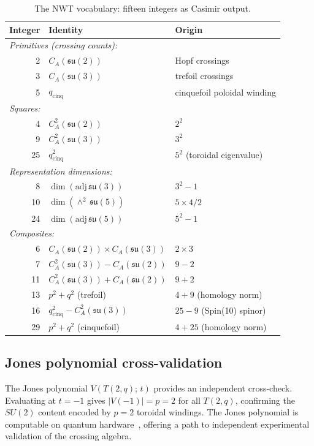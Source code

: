 \documentclass[11pt]{article}
\newcommand{\su}{\mathfrak{su}}
\newcommand{\CA}{C_A}
\begin{document}
\begin{table}[h]
\centering
\caption{The NWT vocabulary: fifteen integers as Casimir output.}
\label{tab:vocabulary}
\begin{tabular}{rll}
\toprule
Integer & Identity & Origin \\
\midrule
\multicolumn{3}{l}{\textit{Primitives (crossing counts):}}\\
2  & $\CA(\su(2))$ & Hopf crossings\\
3  & $\CA(\su(3))$ & trefoil crossings\\
5  & $q_\text{cinq}$ & cinquefoil poloidal winding\\
\midrule
\multicolumn{3}{l}{\textit{Squares:}}\\
4  & $\CA^2(\su(2))$   & $2^2$\\
9  & $\CA^2(\su(3))$   & $3^2$\\
25 & $q_\text{cinq}^2$ & $5^2$ (toroidal eigenvalue)\\
\midrule
\multicolumn{3}{l}{\textit{Representation dimensions:}}\\
8  & $\dim(\mathrm{adj}\,\su(3))$ & $3^2 - 1$\\
10 & $\dim(\wedge^2\,\su(5))$     & $5 \times 4/2$\\
24 & $\dim(\mathrm{adj}\,\su(5))$ & $5^2 - 1$\\
\midrule
\multicolumn{3}{l}{\textit{Composites:}}\\
6  & $\CA(\su(2)) \times \CA(\su(3))$ & $2 \times 3$\\
7  & $\CA^2(\su(3)) - \CA(\su(2))$    & $9 - 2$\\
11 & $\CA^2(\su(3)) + \CA(\su(2))$    & $9 + 2$\\
13 & $p^2 + q^2$ (trefoil)            & $4 + 9$ (homology norm)\\
16 & $q_\text{cinq}^2 - \CA^2(\su(3))$& $25 - 9$ (Spin(10) spinor)\\
29 & $p^2 + q^2$ (cinquefoil)         & $4 + 25$ (homology norm)\\
\bottomrule
\end{tabular}
\end{table}

\subsection{Jones polynomial cross-validation}

The Jones polynomial $V(T(2,q);\,t)$ provides an independent
cross-check.  Evaluating at $t = -1$ gives $|V(-1)| = p = 2$ for
all $T(2,q)$, confirming the $SU(2)$ content encoded by $p = 2$
toroidal windings.  The Jones polynomial is computable on quantum
hardware~\cite{jones-hardware}, offering a path to independent
experimental validation of the crossing algebra.
\end{document}
